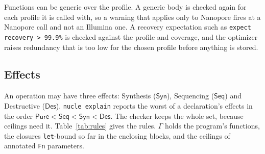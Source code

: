\documentclass[11pt,a4paper]{article}
\newcommand{\Syn}{\mathsf{Syn}}
\newcommand{\Seq}{\mathsf{Seq}}
\newcommand{\Des}{\mathsf{Des}}
\newcommand{\nsl}[1]{\texttt{#1}}
\begin{document}
Functions can be generic over the profile. A generic body is checked
again for each profile it is called with, so a warning that applies only
to Nanopore fires at a Nanopore call and not an Illumina one. A recovery
expectation such as \nsl{expect recovery > 99.9\%} is checked against the
profile and coverage, and the optimizer raises redundancy that is too low
for the chosen profile before anything is stored.

\subsection{Effects}

An operation may have three effects: Synthesis ($\Syn$), Sequencing
($\Seq$) and Destructive ($\Des$). \nsl{nucle explain} reports the worst
of a declaration's effects in the order
$\mathsf{Pure} < \Seq < \Syn < \Des$. The checker keeps the whole set,
because ceilings need it. Table~\ref{tab:rules} gives the rules. $\Gamma$
holds the program's functions, the closures \nsl{let}-bound so far in the
enclosing blocks, and the ceilings of annotated \nsl{Fn} parameters.
\end{document}
